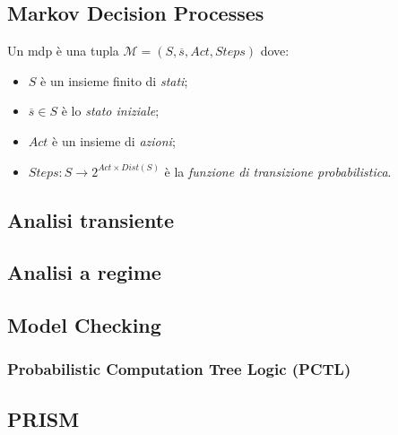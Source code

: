 \subsection{Markov Decision Processes}

\begin{mtdef}
	Un \ac{mdp} è una tupla $\mathcal{M} = (S, \overline{s}, Act, Steps)$ dove:
	\begin{itemize}
		\item $S$ è un insieme finito di \emph{stati};
		\item $\overline{s} \in S$ è lo \emph{stato iniziale};
		\item $Act$ è un insieme di \emph{azioni};
		\item $Steps: S \rightarrow 2^{Act \times Dist(S)}$ è la \emph{funzione di transizione probabilistica}.
	\end{itemize}
\end{mtdef}

\begin{mtdef}[Path]
	
\end{mtdef}

\begin{mtdef}[Paths]
	
\end{mtdef}

\subsection{Analisi transiente}

\subsection{Analisi a regime}

\subsection{Model Checking}

\subsubsection{Probabilistic Computation Tree Logic (PCTL)}

\subsection{PRISM}

